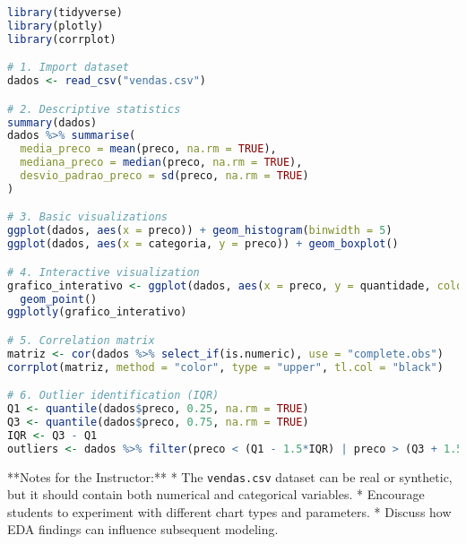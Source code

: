 \begin{lstlisting}[language=R]
library(tidyverse)
library(plotly)
library(corrplot)

# 1. Import dataset
dados <- read_csv("vendas.csv")

# 2. Descriptive statistics
summary(dados)
dados %>% summarise(
  media_preco = mean(preco, na.rm = TRUE),
  mediana_preco = median(preco, na.rm = TRUE),
  desvio_padrao_preco = sd(preco, na.rm = TRUE)
)

# 3. Basic visualizations
ggplot(dados, aes(x = preco)) + geom_histogram(binwidth = 5)
ggplot(dados, aes(x = categoria, y = preco)) + geom_boxplot()

# 4. Interactive visualization
grafico_interativo <- ggplot(dados, aes(x = preco, y = quantidade, color = categoria)) +
  geom_point()
ggplotly(grafico_interativo)

# 5. Correlation matrix
matriz <- cor(dados %>% select_if(is.numeric), use = "complete.obs")
corrplot(matriz, method = "color", type = "upper", tl.col = "black")

# 6. Outlier identification (IQR)
Q1 <- quantile(dados$preco, 0.25, na.rm = TRUE)
Q3 <- quantile(dados$preco, 0.75, na.rm = TRUE)
IQR <- Q3 - Q1
outliers <- dados %>% filter(preco < (Q1 - 1.5*IQR) | preco > (Q3 + 1.5*IQR))
\end{lstlisting}

**Notes for the Instructor:**
* The \texttt{vendas.csv} dataset can be real or synthetic, but it should contain both numerical and categorical variables.
* Encourage students to experiment with different chart types and parameters.
* Discuss how EDA findings can influence subsequent modeling.
